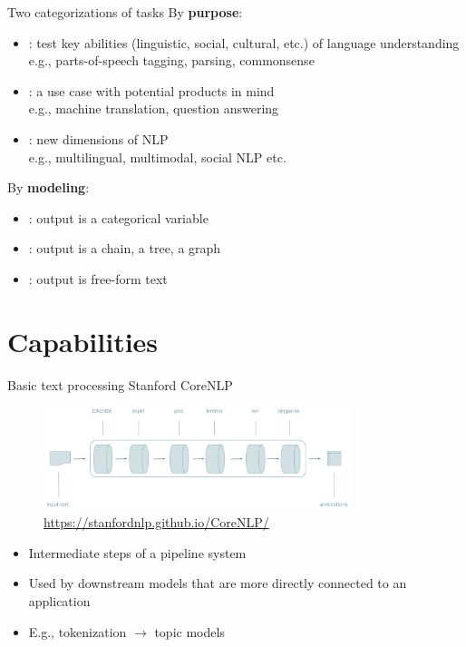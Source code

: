 \documentclass[usenames,dvipsnames,notes,11pt,aspectratio=169,hyperref={colorlinks=true, linkcolor=blue}]{beamer}
\begin{document}
\begin{frame}
    {Two categorizations of tasks}
    By \textbf{purpose}:\\
    \begin{itemize}
        \item {}: test key abilities (linguistic, social, cultural, etc.) of language understanding\\
            e.g., parts-of-speech tagging, parsing, commonsense
        \item {}: a use case with potential products in mind\\
            e.g., machine translation, question answering
        \item {}: new dimensions of NLP\\
            e.g., multilingual, multimodal, social NLP etc.
    \end{itemize}

    \pause
    \medskip
    By \textbf{modeling}:\\
    \begin{itemize}
        \item {}: output is a categorical variable
        \item {}: output is a chain, a tree, a graph
        \item {}: output is free-form text 
    \end{itemize}
\end{frame}

\section{Capabilities}

\begin{frame}
    {Basic text processing}
    Stanford CoreNLP\vspace{-0cm}
    \begin{figure}
        \includegraphics[height=3cm]{figures/pipeline}
        \caption{\url{https://stanfordnlp.github.io/CoreNLP/}}
    \end{figure}\vspace{-0cm}

    \begin{itemize}
        \item Intermediate steps of a pipeline system
        \item Used by downstream models that are more directly connected to an application 
        \item E.g., tokenization $\longrightarrow$ topic models
    \end{itemize}
\end{frame}
\end{document}
